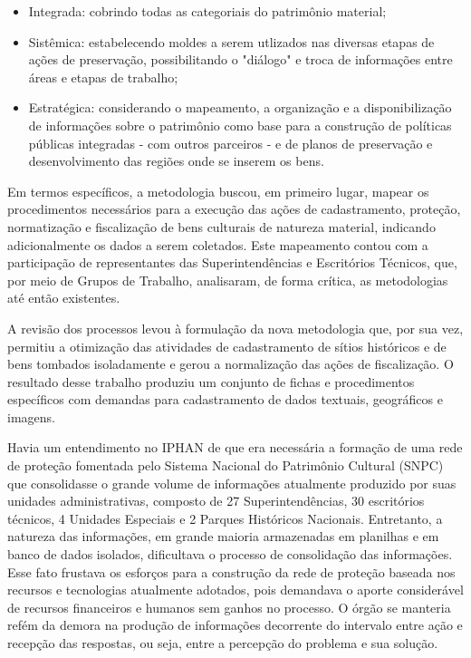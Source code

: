 \begin{itemize}
\item Integrada: cobrindo todas as categoriais do patrimônio material;
\item Sistêmica: estabelecendo moldes a serem utlizados nas diversas etapas de ações de preservação, possibilitando o "diálogo" e troca de informações entre áreas e etapas de trabalho;
\item Estratégica: considerando o mapeamento, a organização e a disponibilização de informações sobre o patrimônio como base para a construção de políticas públicas integradas - com outros parceiros - e de planos de preservação e desenvolvimento das regiões onde se inserem os bens.
\end{itemize}

Em termos específicos, a metodologia buscou, em primeiro lugar, mapear os procedimentos necessários para a execução das ações de cadastramento, proteção, normatização e fiscalização de bens culturais de natureza material, indicando adicionalmente os dados a serem coletados. Este mapeamento contou com a participação de representantes das Superintendências e Escritórios Técnicos, que, por meio de Grupos de Trabalho, analisaram, de forma crítica, as metodologias até então existentes.

A revisão dos processos levou à formulação da nova metodologia que, por sua vez, permitiu a otimização das atividades de cadastramento de sítios históricos e de bens tombados isoladamente e gerou a normalização das ações de fiscalização. O resultado desse trabalho produziu um conjunto de fichas e procedimentos específicos com demandas para cadastramento de dados textuais, geográficos e imagens.

Havia um entendimento no IPHAN de que era necessária a formação de uma rede de proteção fomentada pelo Sistema Nacional do Patrimônio Cultural (SNPC) que consolidasse o grande volume de informações atualmente produzido por suas unidades administrativas, composto de 27 Superintendências, 30 escritórios técnicos, 4 Unidades Especiais e 2 Parques Históricos Nacionais. Entretanto, a natureza das informações, em grande maioria armazenadas em planilhas e em banco de dados isolados, dificultava o processo de consolidação das informações. Esse fato frustava os esforços para a construção da rede de proteção baseada nos recursos e tecnologias atualmente adotados, pois demandava o aporte considerável de recursos financeiros e humanos sem ganhos no processo. O órgão se manteria refém da demora na produção de informações decorrente do intervalo entre ação e recepção das respostas, ou seja, entre a percepção do problema e sua solução.

